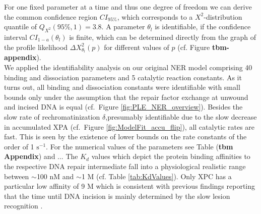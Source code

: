 For one fixed parameter at a time and thus one degree of freedom we can derive the common confidence region $CI_{95\%}$, which corresponds to a $X^2$-distribution quantile of $Q_{X^2}(95\%,1)=3.8$. A parameter $\theta_l$ is identifiable, if the confidence interval $CI_{1-a}(\theta_l)$ is finite, which can be determined directly from the graph of the profile likelihood $\Delta X_{\theta_l}^2(p)$ for different values of $p$ (cf. Figure \textbf{tbm-appendix}).\\ 
We applied the identifiability analysis on our original NER model comprising 40 binding and dissociation parameters and 5 catalytic reaction constants. As it turns out, all binding and dissociation constants were identifiable with small bounds only under the assumption that the repair factor exchange at unwound and incised DNA is equal (cf.\ Figure \ref{fig:PLE_NER_overview}). Besides the slow rate of rechromatinization $\delta$,presumably identifiable due to the slow decrease in accumulated XPA (cf.\ Figure \ref{fig:ModelFit_accu_flip}), all catalytic rates are fast. This is seen by the existence of lower bounds on the rate constants of the order of 1 $\text{s}^{-1}$. For the numerical values of the parameters see Table (\textbf{tbm Appendix}) and ...
The $K_d$ values which depict the protein binding affinities to the respective DNA repair intermediate fall into a physiological realistic range between $\sim$100 nM and $\sim$1 \textmu M (cf. Table \ref{tab:KdValues}). Only XPC has a particular low affinity of 9 \textmu M which is consistent with previous findings reporting that the time until DNA incision is mainly determined by the slow lesion recognition \cite{Luijsterburg2010}.        

